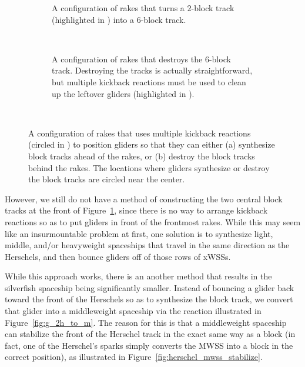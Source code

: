 \begin{figure}[!htbp]
	\centering
	\begin{subfigure}{\textwidth}
		\centering
		\caption{A configuration of rakes that turns a $2$-block track (highlighted in ) into a $6$-block track.}\label{fig:31c_240_track_builder}
	\end{subfigure} \\[0.2cm]
	\begin{subfigure}{\textwidth}
		\centering
		\caption{A configuration of rakes that destroys the $6$-block track. Destroying the tracks is actually straightforward, but multiple kickback reactions must be used to clean up the leftover gliders (highlighted in ).}\label{fig:31c_240_track_destroyer}
	\end{subfigure} \\
	\caption{A configuration of rakes that uses multiple kickback reactions (circled in ) to position gliders so that they can either (a) synthesize block tracks ahead of the rakes, or (b) destroy the block tracks behind the rakes. The locations where gliders synthesize or destroy the block tracks are circled near the center.}\label{fig:31c_240_builder_destroyer}
\end{figure}

However, we still do not have a method of constructing the two central block tracks at the front of Figure~\ref{fig:31c_240_track_builder}, since there is no way to arrange kickback reactions so as to put gliders in front of the frontmost rakes. While this may seem like an insurmountable problem at first, one solution is to synthesize light, middle, and/or heavyweight spaceships that travel in the same direction as the Herschels, and then bounce gliders off of those rows of xWSSs.

While this approach works, there is an another method that results in the silverfish spaceship being significantly smaller. Instead of bouncing a glider back toward the front of the Herschels so as to synthesize the block track, we convert that glider into a middleweight spaceship via the reaction illustrated in Figure~\ref{fig:g_2h_to_m}. The reason for this is that a middleweight spaceship can stabilize the front of the Herschel track in the exact same way as a block (in fact, one of the Herschel's sparks simply converts the MWSS into a block in the correct position), as illustrated in Figure~\ref{fig:herschel_mwss_stabilize}.

